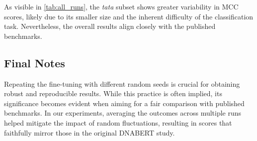 As visible in \autoref{tab:all_runs}, the \textit{tata} subset shows greater variability in MCC scores, likely due to its smaller size and the inherent difficulty of the classification task. Nevertheless, the overall results align closely with the published benchmarks.

\subsection{Final Notes}

Repeating the fine-tuning with different random seeds is crucial for obtaining robust and reproducible results. While this practice is often implied, its significance becomes evident when aiming for a fair comparison with published benchmarks. In our experiments, averaging the outcomes across multiple runs helped mitigate the impact of random fluctuations, resulting in scores that faithfully mirror those in the original DNABERT study.

